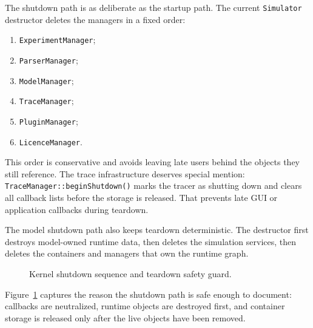 The shutdown path is as deliberate as the startup path. The current
\texttt{Simulator} destructor deletes the managers in a fixed order:
\begin{enumerate}
\item \texttt{ExperimentManager};
\item \texttt{ParserManager};
\item \texttt{ModelManager};
\item \texttt{TraceManager};
\item \texttt{PluginManager};
\item \texttt{LicenceManager}.
\end{enumerate}

This order is conservative and avoids leaving late users behind the objects
they still reference. The trace infrastructure deserves special mention:
\texttt{TraceManager::beginShutdown()} marks the tracer as shutting down and
clears all callback lists before the storage is released. That prevents late
GUI or application callbacks during teardown.

The model shutdown path also keeps teardown deterministic. The destructor
first destroys model-owned runtime data, then deletes the simulation services,
then deletes the containers and managers that own the runtime graph.

\begin{figure}[htbp]
\centering
\caption{Kernel shutdown sequence and teardown safety guard.}
\label{fig:kernel-shutdown-sequence}
\end{figure}

Figure~\ref{fig:kernel-shutdown-sequence} captures the reason the shutdown path
is safe enough to document: callbacks are neutralized, runtime objects are
destroyed first, and container storage is released only after the live objects
have been removed.


